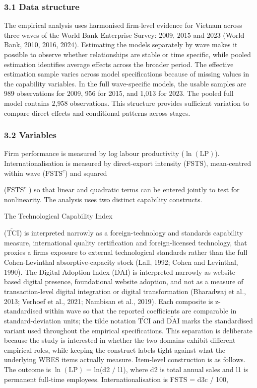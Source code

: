 \documentclass[12pt,a4paper]{article}
\begin{document}
\hypertarget{31-data-structure}{%
\subsubsection{3.1 Data structure}\label{31-data-structure}}

The empirical analysis uses harmonised firm-level evidence for Vietnam
across three waves of the World Bank Enterprise Survey: 2009, 2015 and
2023 (World Bank, 2010, 2016, 2024). Estimating the models separately by
wave makes it possible to observe whether relationships are stable or
time specific, while pooled estimation identifies average effects across
the broader period. The effective estimation sample varies across model
specifications because of missing values in the capability variables. In
the full wave-specific models, the usable samples are 989 observations
for 2009, 956 for 2015, and 1,013 for 2023. The pooled full model
contains 2,958 observations. This structure provides sufficient
variation to compare direct effects and conditional patterns across
stages.

\hypertarget{32-variables}{%
\subsubsection{3.2 Variables}\label{32-variables}}

Firm performance is measured by log labour productivity
(\(\ln(\mathrm{LP})\)). Internationalisation is measured by
direct-export intensity (FSTS), mean-centred within wave
(\(\mathrm{FSTS}^{c}\)) and squared

(\(\mathrm{FSTS}^{c}\) ) so that linear and quadratic terms can be
entered jointly to test for nonlinearity. The analysis uses two distinct
capability constructs.

The Technological Capability Index

(\(\tilde{\mathrm{TCI}}\)) is interpreted narrowly as a
foreign-technology and standards capability measure, international
quality certification and foreign-licensed technology, that proxies a
firm\textquotesingle s exposure to external technological standards
rather than the full Cohen-Levinthal absorptive-capacity stock (Lall,
1992; Cohen and Levinthal, 1990). The Digital Adoption Index
(\(\tilde{\mathrm{DAI}}\)) is interpreted narrowly as website-based
digital presence, foundational website adoption, and not as a measure of
transaction-level digital integration or digital transformation
(Bharadwaj et al., 2013; Verhoef et al., 2021; Nambisan et al., 2019).
Each composite is z-standardised within wave so that the reported
coefficients are comparable in standard-deviation units; the tilde
notation \(\tilde{\mathrm{TCI}}\) and \(\tilde{\mathrm{DAI}}\) marks the
standardised variant used throughout the empirical specifications. This
separation is deliberate because the study is interested in whether the
two domains exhibit different empirical roles, while keeping the
construct labels tight against what the underlying WBES items actually
measure. Item-level construction is as follows. The outcome is
\(\ln(\mathrm{LP})\) = ln(d2 / l1), where d2 is total annual sales and
l1 is permanent full-time employees. Internationalisation is FSTS = d3c
/ 100,
\end{document}
